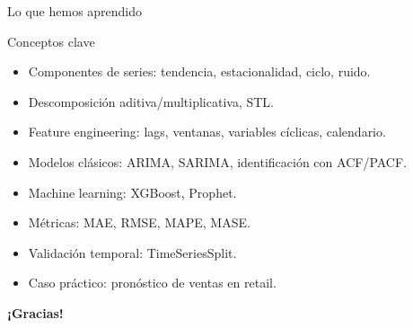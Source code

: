 \documentclass[aspectratio=169, 10pt, xcolor=table]{beamer}
\begin{document}
\begin{frame}{Lo que hemos aprendido}
    \begin{exampleblock}{Conceptos clave}
        \begin{itemize}
            \item Componentes de series: tendencia, estacionalidad, ciclo, ruido.
            \item Descomposición aditiva/multiplicativa, STL.
            \item Feature engineering: lags, ventanas, variables cíclicas, calendario.
            \item Modelos clásicos: ARIMA, SARIMA, identificación con ACF/PACF.
            \item Machine learning: XGBoost, Prophet.
            \item Métricas: MAE, RMSE, MAPE, MASE.
            \item Validación temporal: TimeSeriesSplit.
            \item Caso práctico: pronóstico de ventas en retail.
        \end{itemize}
    \end{exampleblock}
\end{frame}

\begin{frame}
    \centering
    \Huge \textbf{¡Gracias!}

\end{frame}
\end{document}
